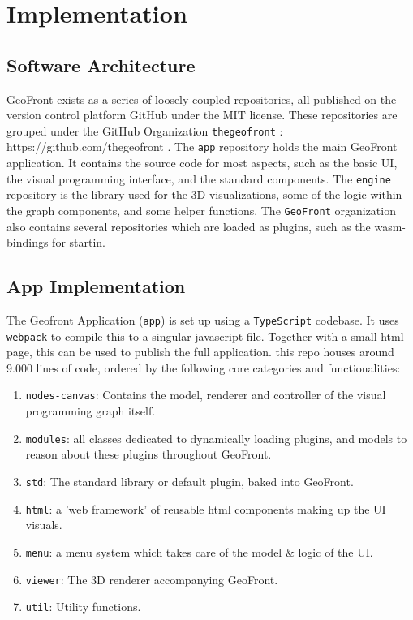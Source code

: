 \chapter{Implementation}%

\section{Software Architecture}
GeoFront exists as a series of loosely coupled repositories, all published on the version control platform GitHub under the MIT license. These repositories are grouped under the GitHub Organization \verb|thegeofront| : https://github.com/thegeofront .
The \verb|app| repository holds the main GeoFront application. It contains the source code for most aspects, such as the basic UI, the visual programming interface, and the standard components. 
The \verb|engine| repository is the library used for the 3D visualizations, some of the logic within the graph components, and some helper functions.
The \verb|GeoFront| organization also contains several repositories which are loaded as plugins, such as the wasm-bindings for startin.

\section{App Implementation}
The Geofront Application (\verb|app|) is set up using a \verb|TypeScript| codebase. It uses \verb|webpack| to compile this to a singular javascript file. Together with a small html page, this can be used to publish the full application. 
this repo houses around 9.000 lines of code, ordered by the following core categories and functionalities:
\begin{enumerate}[I]
  \item \verb|nodes-canvas|: Contains the model, renderer and controller of the visual programming graph itself.  
  \item \verb|modules|: all classes dedicated to dynamically loading plugins, and models to reason about these plugins throughout GeoFront.
  \item \verb|std|: The standard library or default plugin, baked into GeoFront.   
  \item \verb|html|: a 'web framework' of reusable html components making up the UI visuals.
  \item \verb|menu|: a menu system which takes care of the model \& logic of the UI.
  \item \verb|viewer|: The 3D renderer accompanying GeoFront.
  \item \verb|util|: Utility functions.   
\end{enumerate}

